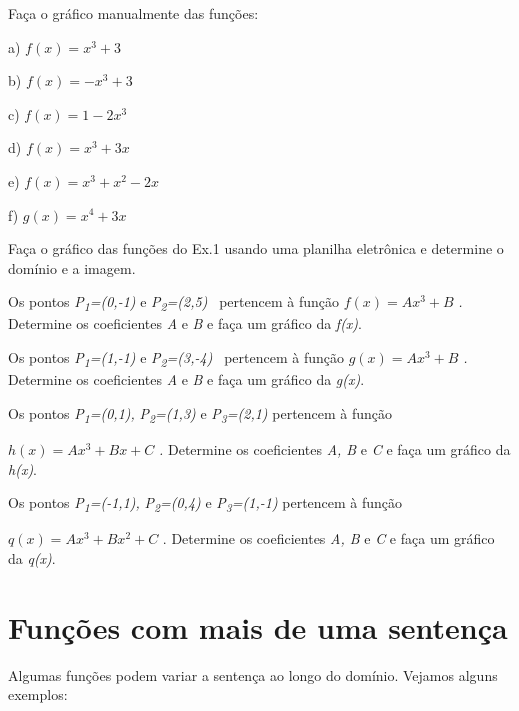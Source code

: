 \begin{exercicios}

	\exitem{} Faça o gráfico manualmente das funções:

\begin{multicols}{3}
	a) \( f \left( x \right) =x^{3}+3 \)

	b) \( f \left( x \right) =-x^{3}+3 \)
	
	c)  \( f \left( x \right) =1-2x^{3} \)

	d)  \( f \left( x \right) =x^{3}+3x \)
	
	e)  \( f \left( x \right) =x^{3}+x^{2}-2x \)

	f)  \( g \left( x \right) =x^{4}+3x \) 
\end{multicols}

	\exitem{} Faça o gráfico das funções do Ex.1 usando uma planilha eletrônica e determine o domínio e a imagem.

	\exitem{} Os pontos \textit{P\textsubscript{1}=(0,-1) }e\textit{ P\textsubscript{2}=(2,5)~ }pertencem à função  \( f \left( x \right) =Ax^{3}+B \) \textit{.} Determine os coeficientes \textit{A} e \textit{B} e faça um gráfico da \textit{f(x)}.

	\exitem{} Os pontos \textit{P\textsubscript{1}=(1,-1) }e\textit{ P\textsubscript{2}=(3,-4)~ }pertencem à função  \( g \left( x \right) =Ax^{3}+B \) \textit{.} Determine os coeficientes \textit{A} e \textit{B} e faça um gráfico da \textit{g(x)}.

	\exitem{} Os pontos \textit{P\textsubscript{1}=(0,1),} \textit{P\textsubscript{2}=(1,3) }e\textit{ P\textsubscript{3}=(2,1) }pertencem à função

  \( h \left( x \right) =Ax^{3}+Bx+C \) \textit{.} Determine os coeficientes \textit{A, B} e \textit{C} e faça um gráfico da \textit{h(x)}.

	\exitem{} Os pontos \textit{P\textsubscript{1}=(-1,1),} \textit{P\textsubscript{2}=(0,4) }e\textit{ P\textsubscript{3}=(1,-1) }pertencem à função

  \( q \left( x \right) =Ax^{3}+Bx^{2}+C \) . Determine os coeficientes \textit{A, B} e \textit{C} e faça um gráfico da \textit{q(x)}.

\end{exercicios}

\section{Funções com mais de uma sentença}
\quad Algumas funções podem variar a sentença ao longo do domínio. Vejamos alguns exemplos:

